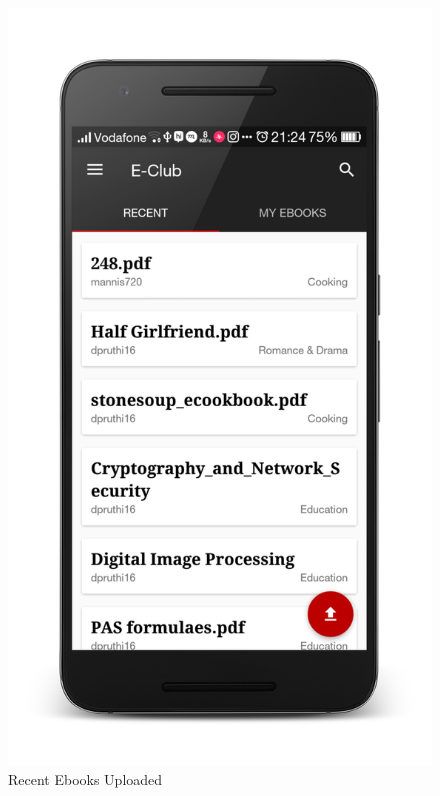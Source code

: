 
\begin{figure}[ht]
\centering
\includegraphics[scale=0.13]{images/d14.png}
\caption{Recent Ebooks Uploaded}
\end{figure}

\newpage

